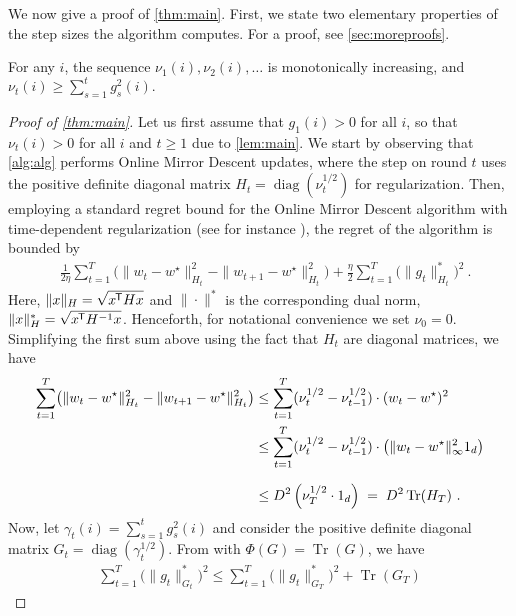 \documentclass[a4paper,11pt]{article}
\DeclareMathOperator*{\trace}{Tr}
\DeclareMathOperator*{\diag}{diag}
\newcommand{\Lr}[1]{\mathopen{}\big(#1\big)}
\newcommand{\norm}[1]{\|#1\|}
\newcommand{\tr}{^{\mkern-1.5mu\scriptstyle\mathsf{T}}}
\newcommand{\st}{\star}
\newcommand{\mi}[1]{\nu_{#1}}
\newcommand{\onev}[1]{\bm{1}_{#1}}
\begin{document}
We now give a proof of \cref{thm:main}. First, we state two elementary
properties of the step sizes the algorithm computes. For a proof, see
\cref{sec:moreproofs}.

\begin{claim} \label{lem:main}
For any $i$, the sequence $\mi{1}(i), \mi{2}(i), \ldots$ is
monotonically increasing, and
$
  \mi{t}(i)
  \geq
  \sum_{s=1}^t g_{s}^2(i)
  .
$
\end{claim}
\vspace{-0.4cm}
\begin{proof}[Proof of \cref{thm:main}]
Let us first assume that $g_1(i) > 0$ for all $i$, so that $\mi{t}(i) > 0$ for
all $i$ and $t \geq 1$ due to \cref{lem:main}.
We start by observing that \cref{alg:alg} performs Online Mirror Descent
updates, where the step on round $t$ uses the positive definite diagonal matrix
$H_t = \diag(\mi{t}^{1/2})$ for regularization. Then, employing a standard
regret bound for the Online Mirror Descent algorithm with time-dependent
regularization (see for instance \citep[Proposition 3]{duchi2011adaptive}), the
regret of the algorithm is bounded by
\begin{align*}
  &\frac{1}{2\eta} \sum_{t=1}^T \Lr{ \norm{w_t-w^\st}_{H_t}^2 - \norm{w_{t+1}-w^\st}_{H_t}^2 }
  + \frac{\eta}{2} \sum_{t=1}^T \Lr{\norm{g_t}_{H_t}^*}^2
  ~.
\end{align*}
Here, $\norm{x}_H = \sqrt{x\tr H x}$ and $\norm{\cdot}^*$ is the corresponding
dual norm, $\norm{x}_H^* = \sqrt{x\tr H^{-1} x}$.
Henceforth, for notational convenience we set $\mi{0}=0$. Simplifying the first
sum above using the fact that $H_t$ are diagonal matrices, we have
\begin{align*}
  \sum_{t=1}^T \Lr{ \norm{w_t-w^\st}_{H_t}^2 - \norm{w_{t+1}-w^\st}_{H_t}^2 }
  &\leq
  \sum_{t=1}^T (\mi{t}^{1/2}-\mi{t-1}^{1/2}) \cdot (w_t-w^\st)^2
  \\
  &\leq
  \sum_{t=1}^T (\mi{t}^{1/2}-\mi{t-1}^{1/2}) \cdot \Lr{\norm{w_t-w^\st}_\infty^2 \onev{d}}
  \\
  &\leq
  \vphantom{\sum^T}
  D^2 \left(\mi{T}^{1/2} \cdot \onev{d}\right)
  \;=\;
  \vphantom{\sum^T}
  D^2 \trace(H_T) ~.
\end{align*}
Now, let $\gamma_t(i) = \sum_{s=1}^t g_s^2(i)$ and consider the positive
definite diagonal matrix $G_t = \diag(\gamma_t^{1/2})$. From \citep[Lemma
2]{shampoo-icml} with $\Phi(G) = \trace(G)$, we have
\begin{align*}
  \sum_{t=1}^T \Lr{\norm{g_t}_{G_t}^*}^2
  \leq
  \sum_{t=1}^T \Lr{\norm{g_t}_{G_T}^*}^2 + \trace(G_T)

\end{align*}
\end{proof}
\end{document}
